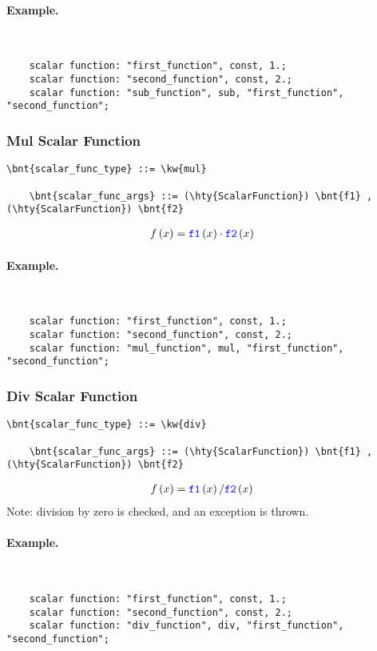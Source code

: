 \paragraph{Example.} \
\begin{verbatim}
    scalar function: "first_function", const, 1.;
    scalar function: "second_function", const, 2.;
    scalar function: "sub_function", sub, "first_function", "second_function";
\end{verbatim}

\subsubsection{Mul Scalar Function}
\begin{Verbatim}[commandchars=\\\{\}]
    \bnt{scalar_func_type} ::= \kw{mul}

    \bnt{scalar_func_args} ::= (\hty{ScalarFunction}) \bnt{f1} , (\hty{ScalarFunction}) \bnt{f2}
\end{Verbatim}
\begin{align}
	f\left( x \right)
	&=
	\textcolor{blue}{\texttt{f1}}\left( x \right) \cdot \textcolor{blue}{\texttt{f2}}\left( x \right)
\end{align}

\paragraph{Example.} \
\begin{verbatim}
    scalar function: "first_function", const, 1.;
    scalar function: "second_function", const, 2.;
    scalar function: "mul_function", mul, "first_function", "second_function";
\end{verbatim}

\subsubsection{Div Scalar Function}
\begin{Verbatim}[commandchars=\\\{\}]
    \bnt{scalar_func_type} ::= \kw{div}

    \bnt{scalar_func_args} ::= (\hty{ScalarFunction}) \bnt{f1} , (\hty{ScalarFunction}) \bnt{f2}
\end{Verbatim}
\begin{align}
	f\left( x \right)
	&=
	\textcolor{blue}{\texttt{f1}}\left( x \right) / \textcolor{blue}{\texttt{f2}}\left( x \right)
\end{align}
Note: division by zero is checked, and an exception is thrown.

\paragraph{Example.} \
\begin{verbatim}
    scalar function: "first_function", const, 1.;
    scalar function: "second_function", const, 2.;
    scalar function: "div_function", div, "first_function", "second_function";
\end{verbatim}

